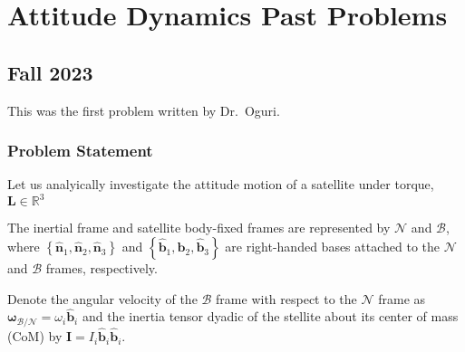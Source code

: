 \newcommand{\vif}[2]{\boldsymbol{#1}_\mathcal{#2}}
\newcommand{\dvif}[2]{\dv{#1}_\mathcal{#2}}
\newcommand{\v}[1]{\boldsymbol{#1}}
\newcommand{\dv}[1]{\dot{\v{#1}}}
\newcommand{\ddv}[1]{\ddot{\v{#1}}}
\newcommand{\uv}[1]{\hat{\v{#1}}}

\newcommand{\q}{\v{q}}
\newcommand{\qb}{\bar{\v{q}}}
\newcommand{\qbb}{\bar{\bar{\v{q}}}}




\maketitle

\section{Attitude Dynamics Past Problems}

\subsection{Fall 2023}

This was the first problem written by Dr.\ Oguri.

\subsubsection{Problem Statement}

Let us analyically investigate the attitude motion of a satellite under torque, $\v{L} \in \mathbb{R}^3$

The inertial frame and satellite body-fixed frames are represented by $\mathcal{N}$ and $\mathcal{B}$, where $\left\{\uv{n}_1, \uv{n}_2, \uv{n}_3\right\}$ and $\left\{\uv{b}_1, \uv{b}_2, \uv{b}_3\right\}$ are right-handed bases attached to the $\mathcal{N}$ and $\mathcal{B}$ frames, respectively.

Denote the angular velocity of the $\mathcal{B}$ frame with respect to the $\mathcal{N}$ frame as $\vif{\omega}{B/N} = \omega_i \uv{b}_i$ and the inertia tensor dyadic of the stellite about its center of mass (CoM) by $\v{I} = I_i \uv{b}_i \uv{b}_i$.

